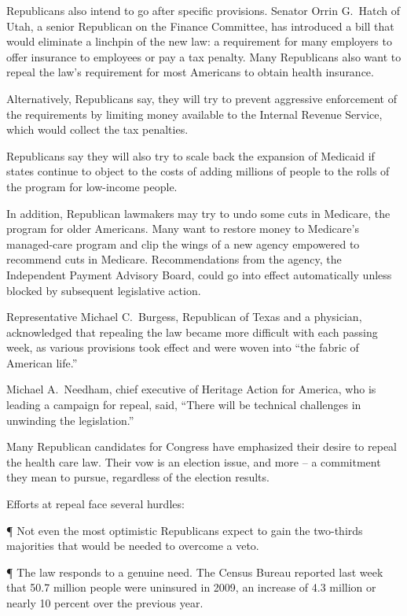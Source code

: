 ﻿\documentclass[12pt]{article}
\begin{document}
Republicans also intend to go after specific provisions. Senator Orrin G.~Hatch of Utah, a senior
Republican on the Finance Committee, has introduced a bill that would eliminate a linchpin of the
new law: a requirement for many employers to offer insurance to employees or pay a tax penalty. Many
Republicans also want to repeal the law's requirement for most Americans to obtain health insurance.

Alternatively, Republicans say, they will try to prevent aggressive enforcement of the requirements
by limiting money available to the Internal Revenue Service, which would collect the tax penalties.

Republicans say they will also try to scale back the expansion of Medicaid if states continue to
object to the costs of adding millions of people to the rolls of the program for low-income people.

In addition, Republican lawmakers may try to undo some cuts in Medicare, the program for older
Americans. Many want to restore money to Medicare's managed-care program and clip the wings of a new
agency empowered to recommend cuts in Medicare. Recommendations from the agency, the Independent
Payment Advisory Board, could go into effect automatically unless blocked by subsequent legislative
action.

Representative Michael C.~Burgess, Republican of Texas and a physician, acknowledged that repealing
the law became more difficult with each passing week, as various provisions took effect and were
woven into ``the fabric of American life.''

Michael A.~Needham, chief executive of Heritage Action for America, who is leading a campaign for
repeal, said, ``There will be technical challenges in unwinding the legislation.''

Many Republican candidates for Congress have emphasized their desire to repeal the health care law.
Their vow is an election issue, and more -- a commitment they mean to pursue, regardless of the
election results.

Efforts at repeal face several hurdles:

¶ Not even the most optimistic Republicans expect to gain the two-thirds majorities that would be
needed to overcome a veto.

¶ The law responds to a genuine need. The Census Bureau reported last week that 50.7 million people
were uninsured in 2009, an increase of 4.3 million or nearly 10 percent over the previous year.
\end{document}
